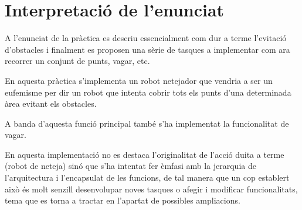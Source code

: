 \section{Interpretació de l'enunciat}

A l'enunciat de la pràctica es descriu essencialment com dur a terme l'evitació
d'obstacles i finalment es proposen una sèrie de tasques a implementar com ara
recorrer un conjunt de punts, vagar, etc.

En aquesta pràctica s'implementa un robot netejador que vendria a ser un eufemisme per dir un
robot que intenta cobrir tots els punts d'una determinada àrea evitant els obstacles.

A banda d'aquesta funció principal també s'ha implementat la funcionalitat de vagar.

En aquesta implementació no es destaca l'originalitat de l'acció duita a terme (robot de neteja)
sinó que s'ha intentat fer èmfasi amb la jerarquia de l'arquitectura i
l'encapsulat de les funcions, de tal manera que un cop establert això és molt
senzill desenvolupar noves tasques o afegir i modificar funcionalitats, tema que
es torna a tractar en l'apartat de possibles ampliacions.